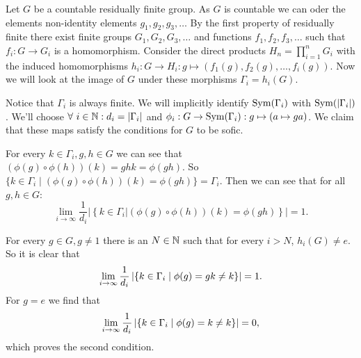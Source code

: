 Let $G$ be a countable residually finite group. As $G$ is countable we can oder the elements non-identity elements $g_1, g_2, g_3, \dots$
By the first property of residually finite there exist finite groups $G_1, G_2, G_3, \dots$ and functions $f_1, f_2, f_3, \dots$ such that $f_i: G \to G_i$ is a homomorphism. Consider the direct products $H_n = \prod_{i = 1}^n G_i$ with the induced homomorphisms $h_i: G \to H_i: g \mapsto (f_1(g), f_2(g), \dots, f_i(g))$. Now we will look at the image of $G$ under these morphisms $\Gamma_i = h_i(G)$.


Notice that $\Gamma_i$ is always finite. We will implicitly identify $\operatorname{Sym}(\Gamma_i)$ with $\operatorname{Sym}(\left| \Gamma_i \right|)$.
We'll choose $\forall\ i \in \mathbb{N}: d_i = \left| \Gamma_i \right|$ and $\phi_i: G \to \operatorname{Sym}(\Gamma_i): g \mapsto (a \mapsto ga)$. We claim that these maps satisfy the conditions for $G$ to be sofic.

For every $k \in \Gamma_i, g, h \in G$ we can see that $(\phi(g) \circ \phi(h))(k) = ghk = \phi(gh)$. So $\{k \in \Gamma_i \mid (\phi(g) \circ \phi(h))(k) = \phi(gh)\} = \Gamma_i$.
Then we can see that for all $g,h \in G$:
$$\lim_{i\to \infty} \frac{1}{d_i} \left|\left\{k \in \Gamma_i| (\phi(g) \circ \phi(h))(k) = \phi(gh)\right\}\right| = 1.$$

For every $g \in G, g\ne 1$ there is an $N \in \mathbb{N}$ such that for every $i > N$, $h_i(G) \ne e$. So it is clear that 
$$\lim_{i \to \infty} \frac{1}{d_i} \left| \left\{k \in \Gamma_i \mid \phi(g) = gk \ne k\right\} \right| = 1.$$
For $g = e$ we find that 
$$\lim_{i \to \infty} \frac{1}{d_i} \left| \left\{k \in \Gamma_i \mid \phi(g) = k \ne k\right\} \right| = 0,$$
which proves the second condition. 